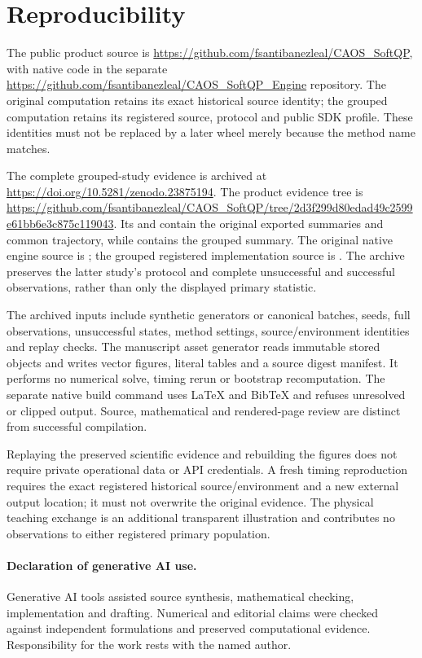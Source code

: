 \section{Reproducibility}\label{sec:reproducibility}
The public product source is
\url{https://github.com/fsantibanezleal/CAOS_SoftQP}, with native code
in the separate
\url{https://github.com/fsantibanezleal/CAOS_SoftQP_Engine} repository.
The original computation retains its exact historical source
identity; the grouped computation retains its registered source,
protocol and public SDK profile. These identities must not be
replaced by a later wheel merely because the method name matches.

The complete grouped-study evidence is archived at
\url{https://doi.org/10.5281/zenodo.23875194}. The product evidence tree is %
\url{https://github.com/fsantibanezleal/CAOS_SoftQP/tree/2d3f299d80edad49c2599e61bb6e3c875c119043}.
Its  and %
 contain the original exported
summaries and common trajectory, while
 contains
the grouped summary. The original native engine source is
; the grouped registered
implementation source is .
The archive preserves the latter study's protocol and complete unsuccessful
and successful observations, rather than only the displayed primary statistic.

The archived inputs include synthetic generators or canonical
batches, seeds, full observations, unsuccessful states, method
settings, source/environment identities and replay checks.
The manuscript asset generator reads immutable stored objects
and writes vector figures, literal tables and a source digest
manifest. It performs no numerical solve, timing rerun or
bootstrap recomputation. The separate native build command
uses LaTeX and BibTeX and refuses unresolved or clipped output.
Source, mathematical and rendered-page review are distinct
from successful compilation.

Replaying the preserved scientific evidence and rebuilding the
figures does not require private operational data or API
credentials. A fresh timing reproduction requires the exact
registered historical source/environment and a new external
output location; it must not overwrite the original evidence.
The physical teaching exchange is an additional transparent
illustration and contributes no observations to either
registered primary population.

\paragraph{Declaration of generative AI use.}
Generative AI tools assisted source synthesis, mathematical
checking, implementation and drafting. Numerical and editorial
claims were checked against independent formulations and
preserved computational evidence. Responsibility for the work
rests with the named author.
